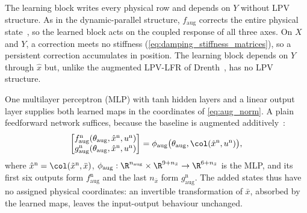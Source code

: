 The learning block writes every physical row and depends on $Y$ without LPV
structure.
As in the dynamic-parallel structure, $f_{\mathrm{aug}}$ corrects the entire
physical state~\cite[Sec.~2]{hoekstra2025lfr}, so the learned block acts on the
coupled response of all three axes.
On $X$ and $Y$, a correction meets no stiffness
(\eqref{eq:damping_stiffness_matrices}), so a persistent correction accumulates
in position.
The learning block depends on $Y$ through $\hat x$ but, unlike the augmented
LPV-LFR of Drenth~\cite[Eq.~(5.2)]{drenth2025thesis}, has no LPV structure.

One multilayer perceptron (MLP) with tanh hidden layers and a linear output
layer supplies both learned maps in the coordinates of \eqref{eq:aug_norm}.
A plain feedforward network suffices, because the baseline is augmented
additively~\cite[Sec.~4.3]{hoekstra2025lfr}:
\begin{equation}
 \begin{bmatrix}
  f^{\mathrm n}_{\mathrm{aug}}(\theta_{\mathrm{aug}},\hat x^{\mathrm n},u^{\mathrm n})\\
  g^{\mathrm n}_{\mathrm{aug}}(\theta_{\mathrm{aug}},\hat x^{\mathrm n},u^{\mathrm n})
 \end{bmatrix}
 =\phi_{\mathrm{aug}}\bigl(\theta_{\mathrm{aug}},\col(\hat x^{\mathrm n},u^{\mathrm n})\bigr),
 \label{eq:aug_network}
\end{equation}
where $\hat x^{\mathrm n}=\col(\tilde x^{\mathrm n},\bar x)$,
$\phi_{\mathrm{aug}}:\R^{n_{\mathrm{aug}}}\times\R^{9+n_{\bar x}}\to\R^{6+n_{\bar x}}$
is the MLP, and its first six outputs form $f^{\mathrm n}_{\mathrm{aug}}$ and
the last $n_{\bar x}$ form $g^{\mathrm n}_{\mathrm{aug}}$.
The added states thus have no assigned physical coordinates: an invertible
transformation of $\bar x$, absorbed by the learned maps, leaves the
input-output behaviour unchanged.

